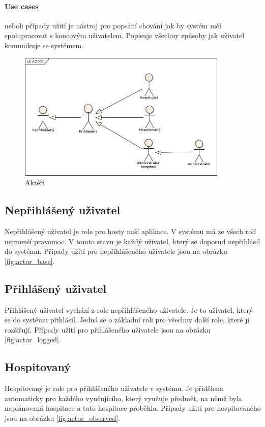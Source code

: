 \paragraph*{Use cases}
neboli případy užití je nástroj pro popsání chování jak by systém měl spolupracovat s koncovým uživatelem. Popisuje všechny způsoby jak uživatel komunikuje se systémem.

\begin{figure}[H]
\begin{center}
\includegraphics[width=10cm]{figures/Actors}
\caption{Aktéři}
\label{fig:actors}
\end{center}
\end{figure}

\subsection{Nepřihlášený uživatel}
Nepřihlášený uživatel je role pro hosty naší aplikace. V systému má ze všech rolí nejmenší pravomoc. V tomto stavu je každý uživatel, který se doposud nepřihlásil do systému. Případy užití pro nepřihlášeného uživatele jsou na obrázku \ref{fig:actor_base}.

\subsection{Přihlášený uživatel}
Přihlášený uživatel vychází z role nepřihlášeného uživatele. Je to uživatel, který se do systému přihlásil. Jedná se o základní roli pro všechny další role, které ji rozšiřují. Případy užití pro přihlášeného uživatele jsou na obrázku \ref{fig:actor_logged}.

\subsection{Hospitovaný}
Hospitovaný je role pro přihlášeného uživatele v systému. Je přidělena automaticky pro každého vyučujícího, který vyučuje předmět, na němž byla naplánovaná hospitace a tato hospitace proběhla. Případy užití pro hospitovaného jsou na obrázku \ref{fig:actor_observed}.

